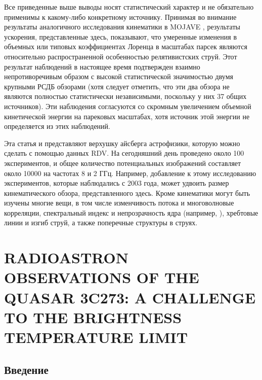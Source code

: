 Все приведенные выше выводы носят статистический характер и не обязательно применимы к
какому-либо конкретному источнику. Принимая во внимание результаты аналогичного исследования
кинематики в MOJAVE \cite{Homan_2009}, результаты ускорения, представленные здесь, показывают, что
умеренные изменения в объемных или типовых коэффициентах Лоренца в масштабах парсек являются
относительно распространенной особенностью релятивистских струй. Этот результат наблюдений в
настоящее время подтвержден взаимно непротиворечивым образом с высокой статистической значимостью
двумя крупными РСДБ обзорами (хотя следует отметить, что эти два обзора не являются
полностью статистически независимыми, поскольку у них 37 общих источников). Эти наблюдения
согласуются со скромным увеличением объемной кинетической энергии на парековых масштабах, хотя
источник этой энергии не определяется из этих наблюдений.

Эта статья и \cite{Piner_2007} представляют верхушку айсберга астрофизики, которую можно сделать с
помощью данных RDV. На сегодняшний день проведено около 100 экспериментов, и общее количество
потенциальных изображений составляет около 10000 на частотах 8 и 2 ГГц. Например, добавление к этому
исследованию экспериментов, которые наблюдались с 2003 года, может удвоить размер
кинематического обзора, представленного здесь. Кроме кинематики могут быть изучены многие вещи, в
том числе изменчивость потока и многоволновые корреляции, спектральный индекс и непрозрачность
ядра (например, \cite{Kovalev_2008,Pushkarev_2012b}), хребтовые линии и изгиб струй, а
также поперечные структуры в струях.


\section{RADIOASTRON OBSERVATIONS OF THE QUASAR 3C273:
A CHALLENGE TO THE BRIGHTNESS TEMPERATURE LIMIT}

\subsection{Введение}

